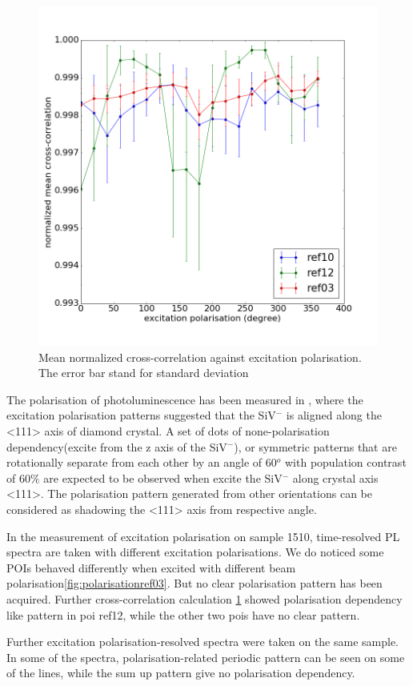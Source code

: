 \begin{figure}[h]
\centering
\includegraphics[width=0.7\linewidth]{"Figures/pic/excitation polarisation"}
\caption{Mean normalized cross-correlation against excitation polarisation. The error bar stand for standard deviation}
\label{fig:excitation-polarisation of untreated nanodiamond batch 2}
\end{figure}

The polarisation of photoluminescence has been measured in \cite{rogers_all-optical_2014}, where the excitation polarisation patterns suggested that the SiV$^{-}$ is aligned along the <111> axis of diamond crystal. A set of dots of none-polarisation dependency(excite from the z axis of the SiV$^{-}$), or symmetric patterns that are rotationally separate from each other by an angle of 60$^{o}$ with population contrast of 60$\%$ are expected to be observed when excite the SiV$^{-}$ along crystal axis <111>. The polarisation pattern generated from other orientations can be considered as shadowing the <111> axis from respective angle.

In the measurement of excitation polarisation on sample 1510, time-resolved PL spectra are taken with different excitation polarisations. We do noticed some POIs behaved differently when excited with different beam polarisation\ref{fig:polarisationref03}. But no clear polarisation pattern has been acquired. Further cross-correlation calculation \ref{fig:excitation-polarisation of untreated nanodiamond batch 2} showed polarisation dependency like pattern in poi ref12, while the other two pois have no clear pattern.

Further excitation polarisation-resolved spectra were taken on the same sample. In some of the spectra, polarisation-related periodic pattern can be seen on some of the lines, while the sum up pattern give no polarisation dependency.



